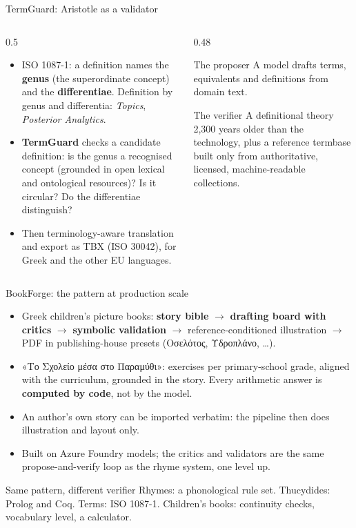 \documentclass[aspectratio=169, 10pt]{beamer}
\newcommand{\key}[1]{\textcolor{aegean}{\textbf{#1}}}
\begin{document}
\begin{frame}{TermGuard: Aristotle as a validator}
  \begin{columns}[T]
    \begin{column}{0.5\textwidth}
      \begin{itemize}
        \item ISO 1087-1: a definition names the \textbf{genus} (the superordinate concept) and the \textbf{differentiae}. Definition by genus and differentia: \emph{Topics}, \emph{Posterior Analytics}.
        \item \key{TermGuard} checks a candidate definition: is the genus a recognised concept (grounded in open lexical and ontological resources)? Is it circular? Do the differentiae distinguish?
        \item Then terminology-aware translation and export as TBX (ISO 30042), for Greek and the other EU languages.
      \end{itemize}
    \end{column}
    \begin{column}{0.48\textwidth}
      \begin{block}{The proposer}
        A model drafts terms, equivalents and definitions from domain text.
      \end{block}
      \begin{block}{The verifier}
        A definitional theory 2,300 years older than the technology, plus a reference termbase built only from authoritative, licensed, machine-readable collections.
      \end{block}
    \end{column}
  \end{columns}
\end{frame}

\begin{frame}{BookForge: the pattern at production scale}
  \begin{itemize}
    \item Greek children's picture books: \textbf{story bible} $\rightarrow$ \textbf{drafting board with critics} $\rightarrow$ \textbf{symbolic validation} $\rightarrow$ reference-conditioned illustration $\rightarrow$ PDF in publishing-house presets (Οσελότος, Υδροπλάνο, \ldots).
    \item «Το Σχολείο μέσα στο Παραμύθι»: exercises per primary-school grade, aligned with the curriculum, grounded in the story. Every arithmetic answer is \textbf{computed by code}, not by the model.
    \item An author's own story can be imported verbatim: the pipeline then does illustration and layout only.
    \item Built on Azure Foundry models; the critics and validators are the same propose-and-verify loop as the rhyme system, one level up.
  \end{itemize}
  \begin{block}{Same pattern, different verifier}
    Rhymes: a phonological rule set. Thucydides: Prolog and Coq. Terms: ISO 1087-1. Children's books: continuity checks, vocabulary level, a calculator.
  \end{block}
\end{frame}
\end{document}
